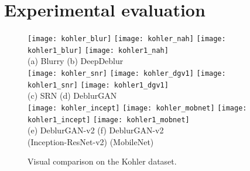 \documentclass[10pt,twocolumn,letterpaper]{article}
\begin{document}
    


















\vspace{-0.2em}
\section{Experimental evaluation}
\vspace{-0.4em}

\begin{figure}[htb]
	\centering
    \captionsetup{justification=centering}
        \texttt{[image: kohler\_blur]}
        \texttt{[image: kohler\_nah]}
    \vspace{0.25em}
        \texttt{[image: kohler1\_blur]}
        \texttt{[image: kohler1\_nah]}
          \\  \small{(a) Blurry \qquad \qquad \qquad (b) DeepDeblur \cite{Nah2016DeepDeblurring}}
          \\
          \vspace{0.25em}
        \texttt{[image: kohler\_snr]}
        \texttt{[image: kohler\_dgv1]}
    \vspace{0.25em}
        \texttt{[image: kohler1\_snr]}
        \texttt{[image: kohler1\_dgv1]}
        \\  \small{(c) SRN \cite{tao2018scale} \qquad \qquad \qquad (d) DeblurGAN \cite{kupyn2018deblurgan}}
          \\
    \vspace{0.25em}
        \texttt{[image: kohler\_incept]}
        \texttt{[image: kohler\_mobnet]}
    \vspace{0.25em}
        \texttt{[image: kohler1\_incept]}
        \texttt{[image: kohler1\_mobnet]}
        \\\footnotesize{(e) DeblurGAN-v2 \qquad \qquad \qquad (f) DeblurGAN-v2 \\ \quad (Inception-ResNet-v2)  \qquad \qquad \qquad \quad (MobileNet) \qquad}
            \vspace{-0.5em}
    \caption{Visual comparison on the Kohler dataset.}
    \vspace{-1em}
    \label{fig:kohler_test}
\end{figure}
\end{document}

